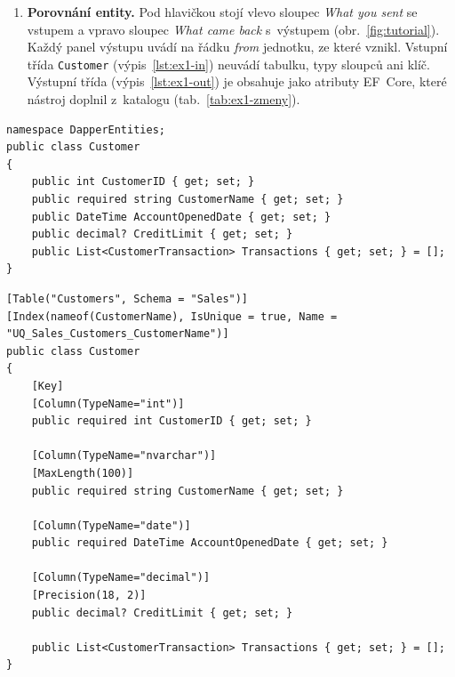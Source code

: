 
\begin{enumerate}[resume,leftmargin=*,itemsep=2pt]
\item \textbf{Porovnání entity.} Pod hlavičkou stojí vlevo sloupec \emph{What you sent} se vstupem a vpravo sloupec \emph{What came back} s~výstupem (obr.~\ref{fig:tutorial}). Každý panel výstupu uvádí na řádku \emph{from} jednotku, ze které vznikl. Vstupní třída \texttt{Customer} (výpis~\ref{lst:ex1-in}) neuvádí tabulku, typy sloupců ani klíč. Výstupní třída (výpis~\ref{lst:ex1-out}) je obsahuje jako atributy EF~Core, které nástroj doplnil z~katalogu (tab.~\ref{tab:ex1-zmeny}).
\end{enumerate}

\noindent\begin{minipage}{\linewidth}
\begin{lstlisting}[language={[Sharp]C},caption={První převod, vstup entity: \texttt{Customer.cs}.},label={lst:ex1-in}]
namespace DapperEntities;
public class Customer
{
    public int CustomerID { get; set; }
    public required string CustomerName { get; set; }
    public DateTime AccountOpenedDate { get; set; }
    public decimal? CreditLimit { get; set; }
    public List<CustomerTransaction> Transactions { get; set; } = [];
}
\end{lstlisting}
\end{minipage}

\noindent\begin{minipage}{\linewidth}
\begin{lstlisting}[language={[Sharp]C},caption={První převod, výstup entity: \texttt{Customer.cs} (zkráceno).},label={lst:ex1-out}]
[Table("Customers", Schema = "Sales")]
[Index(nameof(CustomerName), IsUnique = true, Name = "UQ_Sales_Customers_CustomerName")]
public class Customer
{
    [Key]
    [Column(TypeName="int")]
    public required int CustomerID { get; set; }

    [Column(TypeName="nvarchar")]
    [MaxLength(100)]
    public required string CustomerName { get; set; }

    [Column(TypeName="date")]
    public required DateTime AccountOpenedDate { get; set; }

    [Column(TypeName="decimal")]
    [Precision(18, 2)]
    public decimal? CreditLimit { get; set; }

    public List<CustomerTransaction> Transactions { get; set; } = [];
}
\end{lstlisting}
\end{minipage}

